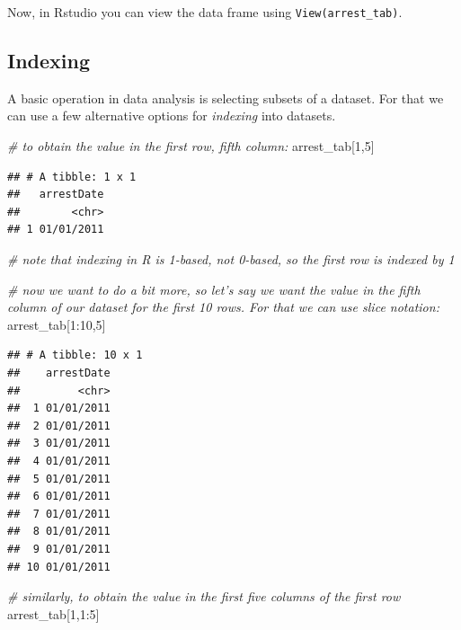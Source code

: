 \documentclass[]{article}
\newenvironment{Shaded}{\begin{snugshade}}{\end{snugshade}}
\newcommand{\DecValTok}[1]{\textcolor[rgb]{0.00,0.00,0.81}{{#1}}}
\newcommand{\CommentTok}[1]{\textcolor[rgb]{0.56,0.35,0.01}{\textit{{#1}}}}
\newcommand{\NormalTok}[1]{{#1}}
\theoremstyle{definition}
\theoremstyle{definition}
\theoremstyle{remark}
\begin{document}
Now, in Rstudio you can view the data frame using
\texttt{View(arrest\_tab)}.

\subsection{Indexing}\label{indexing}

A basic operation in data analysis is selecting subsets of a dataset.
For that we can use a few alternative options for \emph{indexing} into
datasets.

\begin{Shaded}
\begin{Highlighting}[]
\CommentTok{# to obtain the value in the first row, fifth column:}
\NormalTok{arrest_tab[}\DecValTok{1}\NormalTok{,}\DecValTok{5}\NormalTok{]}
\end{Highlighting}
\end{Shaded}

\begin{verbatim}
## # A tibble: 1 x 1
##   arrestDate
##        <chr>
## 1 01/01/2011
\end{verbatim}

\begin{Shaded}
\begin{Highlighting}[]
\CommentTok{# note that indexing in R is 1-based, not 0-based, so the first row is indexed by 1}

\CommentTok{# now we want to do a bit more, so let's say we want the value in the fifth column of our dataset for the first 10 rows. For that we can use slice notation:}
\NormalTok{arrest_tab[}\DecValTok{1}\NormalTok{:}\DecValTok{10}\NormalTok{,}\DecValTok{5}\NormalTok{]}
\end{Highlighting}
\end{Shaded}

\begin{verbatim}
## # A tibble: 10 x 1
##    arrestDate
##         <chr>
##  1 01/01/2011
##  2 01/01/2011
##  3 01/01/2011
##  4 01/01/2011
##  5 01/01/2011
##  6 01/01/2011
##  7 01/01/2011
##  8 01/01/2011
##  9 01/01/2011
## 10 01/01/2011
\end{verbatim}

\begin{Shaded}
\begin{Highlighting}[]
\CommentTok{# similarly, to obtain the value in the first five columns of the first row}
\NormalTok{arrest_tab[}\DecValTok{1}\NormalTok{,}\DecValTok{1}\NormalTok{:}\DecValTok{5}\NormalTok{]}
\end{Highlighting}
\end{Shaded}
\end{document}
